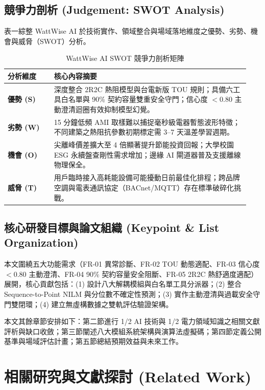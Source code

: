 \documentclass[conference]{IEEEtran}
\begin{document}
\subsection{競爭力剖析 (Judgement: SWOT Analysis)}
表一綜整 WattWise AI 於技術實作、領域整合與場域落地維度之優勢、劣勢、機會與威脅（SWOT）分析。

\begin{table}[t]
\centering
\caption{WattWise AI SWOT 競爭力剖析矩陣}
\label{tab:swot}
\renewcommand{\arraystretch}{1.25}
\begin{tabular}{@{}p{0.18\linewidth}p{0.76\linewidth}@{}}
\toprule
\textbf{分析維度} & \textbf{核心內容摘要} \\
\midrule
\textbf{優勢 (S)} & 深度整合 2R2C 熱阻模型與台電新版 TOU 規則；具備六工具白名單與 90\% 契約容量雙重安全守門；信心度 $< 0.80$ 主動澄清迴圈有效抑制模型幻覺。 \\
\textbf{劣勢 (W)} & 15 分鐘低頻 AMI 取樣難以捕捉毫秒級電器暫態波形特徵；不同建築之熱阻抗參數初期標定需 3--7 天溫差學習週期。 \\
\textbf{機會 (O)} & 尖離峰價差擴大至 4 倍顯著提升節能投資回報；大學校園 ESG 永續盤查剛性需求增加；邊緣 AI 閘道器普及支援離線物理保全。 \\
\textbf{威脅 (T)} & 用戶臨時接入高耗能設備可能擾動日前最佳化排程；跨品牌空調與電表通訊協定（BACnet/MQTT）存在標準破碎化挑戰。 \\
\bottomrule
\end{tabular}
\end{table}

\subsection{核心研發目標與論文組織 (Keypoint \& List Organization)}
本文圍繞五大功能需求（FR-01 異常診斷、FR-02 TOU 動態適配、FR-03 信心度 $< 0.80$ 主動澄清、FR-04 90\% 契約容量安全阻斷、FR-05 2R2C 熱舒適度適配）展開，核心貢獻包括：(1) 設計八大解耦模組與白名單工具分派器；(2) 整合 Sequence-to-Point NILM 與分位數不確定性預測；(3) 實作主動澄清與過載安全守門雙閉環；(4) 建立無虛構數據之雙軌評估驗證架構。

本文其餘章節安排如下：第二節進行 1/2 AI 技術與 1/2 電力領域知識之相關文獻評析與缺口收斂；第三節闡述八大模組系統架構與演算法虛擬碼；第四節定義公開基準與場域評估計畫；第五節總結預期效益與未來工作。

\section{相關研究與文獻探討 (Related Work)}
\end{document}
